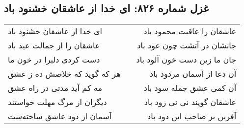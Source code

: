 \begin{center}
\section*{غزل شماره ۸۲۶: ای خدا از عاشقان خشنود باد}
\label{sec:0826}
\begin{longtable}{l p{0.5cm} r}
ای خدا از عاشقان خشنود باد
&&
عاشقان را عاقبت محمود باد
\\
عاشقان را از جمالت عید باد
&&
جانشان در آتشت چون عود باد
\\
دست کردی دلبرا در خون ما
&&
جان ما زین دست خون آلود باد
\\
هر که گوید که خلاصش ده ز عشق
&&
آن دعا از آسمان مردود باد
\\
مه کم آید مدتی در راه عشق
&&
آن کمی عشق جمله سود باد
\\
دیگران از مرگ مهلت خواستند
&&
عاشقان گویند نی نی زود باد
\\
آسمان از دود عاشق ساخته‌ست
&&
آفرین بر صاحب این دود باد
\\
\end{longtable}
\end{center}
